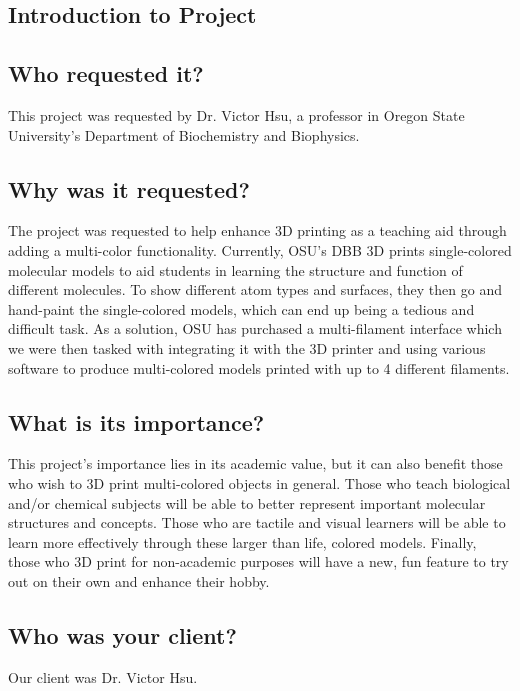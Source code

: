 \documentclass[letterpaper, onecolumn, draftclsnofoot, 10pt, compsoc]{IEEEtran}
\begin{document}
\newpage
\tableofcontents
\newpage
\clearpage

\begin{singlespace}

\section{Introduction to Project}
\subsection{Who requested it?}
This project was requested by Dr. Victor Hsu, a professor in Oregon State University's Department of Biochemistry and Biophysics.
\subsection{Why was it requested?}
The project was requested to help enhance 3D printing as a teaching aid through adding a multi-color functionality. 
Currently, OSU's DBB 3D prints single-colored molecular models to aid students in learning the structure and function of different molecules.
To show different atom types and surfaces, they then go and hand-paint the single-colored models, which can end up being a tedious and difficult task.
As a solution, OSU has purchased a multi-filament interface which we were then tasked with integrating it with the 3D printer and using various software to produce multi-colored models printed with up to 4 different filaments.
\subsection{What is its importance?}
This project's importance lies in its academic value, but it can also benefit those who wish to 3D print multi-colored objects in general. 
Those who teach biological and/or chemical subjects will be able to better represent important molecular structures and concepts.
Those who are tactile and visual learners will be able to learn more effectively through these larger than life, colored models.
Finally, those who 3D print for non-academic purposes will have a new, fun feature to try out on their own and enhance their hobby.
\subsection{Who was your client?}
Our client was Dr. Victor Hsu.

\end{singlespace}
\end{document}
